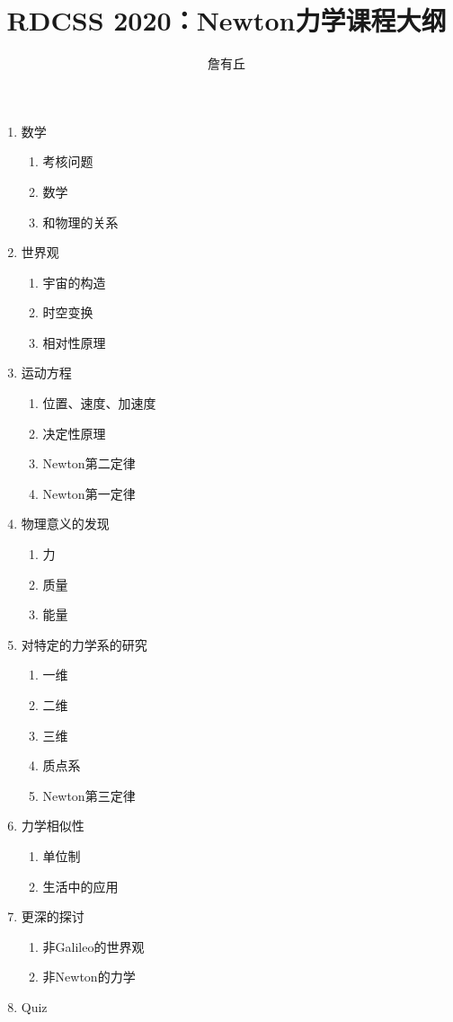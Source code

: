 \documentclass{article}
\title{RDCSS 2020：Newton力学课程大纲}
\author{詹有丘}
\begin{document}
\maketitle

\begin{enumerate}
	\item 数学
	\begin{enumerate}
		\item 考核问题
		\item 数学
		\item 和物理的关系
	\end{enumerate}
	\item 世界观
	\begin{enumerate}
		\item 宇宙的构造
		\item 时空变换
		\item 相对性原理
	\end{enumerate}
	\item 运动方程
	\begin{enumerate}
		\item 位置、速度、加速度
		\item 决定性原理
		\item Newton第二定律
		\item Newton第一定律
	\end{enumerate}
	\item 物理意义的发现
	\begin{enumerate}
		\item 力
		\item 质量
		\item 能量
	\end{enumerate}
	\item 对特定的力学系的研究
	\begin{enumerate}
		\item 一维
		\item 二维
		\item 三维
		\item 质点系
		\item Newton第三定律
	\end{enumerate}
	\item 力学相似性
	\begin{enumerate}
		\item 单位制
		\item 生活中的应用
	\end{enumerate}
	\item 更深的探讨
	\begin{enumerate}
		\item 非Galileo的世界观
		\item 非Newton的力学
	\end{enumerate}
	\item Quiz
\end{enumerate}
\end{document}
